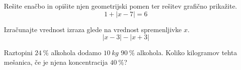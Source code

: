 \documentclass[addpoints]{exam}
\begin{document}
\begin{questions}


        \question
        Rešite enačbo in opišite njen geometrijski pomen ter rešitev grafično prikažite. $$1+\left|x-7\right|=6$$


    
    



    \question
    Izračunajte vrednost izraza glede na vrednost spremenljivke $x$. $$\left|x-3\right|-\left|x+3\right|$$


    \question
    Raztopini $24~\%$ alkohola dodamo $10~kg$ $90~\%$ alkohola. Koliko kilogramov tehta mešanica, če je njena koncentracija $40~\%$?











\end{questions}
\end{document}
